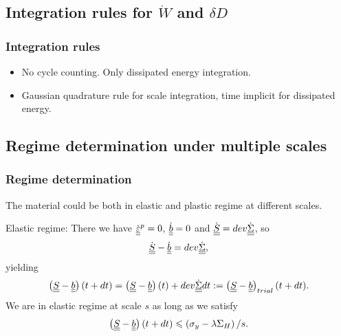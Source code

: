 \documentclass[xcolor=table]{Bredelebeamer}
\begin{document}
\subsection{Integration rules for $\dot{W}$ and $\delta D$}

\begin{frame}
\frametitle{Integration rules}
	\begin{block}{}	
\begin{itemize}
\item No cycle counting. Only dissipated energy integration.
					
\vspace{6pt}
\item Gaussian quadrature rule for scale integration, time implicit for dissipated energy.

\end{itemize}	
\end{block}
\end{frame}	

\subsection{Regime determination under multiple scales}
\begin{frame}
	\frametitle{Regime determination}
	The material could be both in elastic and plastic regime at different scales.
	\begin{block}{Elastic regime:}	
\noindent
There we have
$\dot{\uline{\uline{\varepsilon}}}^p=0$, $\dot{\uline{\uline{b}}}=0$ and $\dot{\uline{\uline{S}}}=dev\dot{\uline{\uline{\Sigma}}}$, so
$$\dot{\uline{\uline{S}}}-\dot{\uline{\uline{b}}}=dev\dot{\uline{\uline{\Sigma}}},$$ 
yielding
\begin{equation}
\left( \uline{\uline{S}}-\uline{\uline{b}}\right) (t+dt)=\left( \uline{\uline{S}}-\uline{\uline{b}}\right) (t)+dev\dot{\uline{\uline{\Sigma}}}dt:=\left(  \uline{\uline{S}}-\uline{\uline{b}}\right)_{trial}(t+dt).
\label{trial}
\end{equation}
We are in elastic regime at scale $s$ as long as we satisfy
$$\left( \uline{\uline{S}}-\uline{\uline{b}}\right) (t+dt)\leqslant\left( \sigma_y-\lambda \Sigma_H\right)/s.$$	
	\end{block}
\end{frame}	
\end{document}

